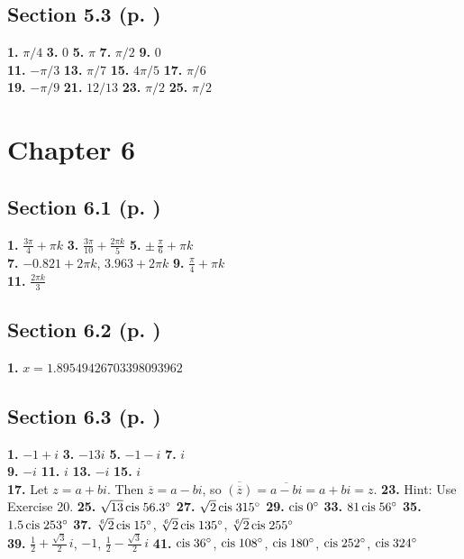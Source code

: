 \begin{multicols}{2}
\subsection*{Section 5.3 (p. \pageref{sec5dot3})}
\textbf{1.} $\pi/4$ \quad \textbf{3.} $0$ \quad \textbf{5.} $\pi$ \quad \textbf{7.} $\pi/2$ \quad
\textbf{9.} $0$\\\textbf{11.} $-\pi/3$ \quad \textbf{13.} $\pi/7$ \quad \textbf{15.} $4\pi/5$
\quad \textbf{17.} $\pi/6$\\\textbf{19.} $-\pi/9$ \quad \textbf{21.} $12/13$ \quad
\textbf{23.} $\pi/2$ \quad \textbf{25.} $\pi/2$
\section*{Chapter 6}
\subsection*{Section 6.1 (p. \pageref{sec6dot1})}
\textbf{1.} $\frac{3\pi}{4} + \pi k$ \quad \textbf{3.} $\frac{3\pi}{10} + \frac{2\pi k}{5}$ \quad
\textbf{5.} $\pm\,\frac{\pi}{6} + \pi k$\\\textbf{7.} $-0.821 + 2\pi k$, $3.963 + 2\pi k$ \quad
\textbf{9.} $\frac{\pi}{4} + \pi k$\\\textbf{11.} $\frac{2\pi k}{3}$
\subsection*{Section 6.2 (p. \pageref{sec6dot2})}
\textbf{1.} $x=1.89549426703398093962$
\subsection*{Section 6.3 (p. \pageref{sec6dot3})}
\textbf{1.} $-1+i$ \quad \textbf{3.} $-13i$ \quad \textbf{5.} $-1-i$ \quad \textbf{7.} $i$\\
\textbf{9.} $-i$ \quad \textbf{11.} $i$ \quad \textbf{13.} $-i$ \quad \textbf{15.} $i$\\
\textbf{17.} Let $z=a+bi$. Then $\overline{z}=a-bi$, so $\overline{\left(\overline{z}\right)} =
\overline{a-bi}=a+bi=z$. \quad \textbf{23.} Hint: Use Exercise 20. \quad
\textbf{25.} $\sqrt{13}\,\text{cis}\;56.3^\circ$ \quad
\textbf{27.} $\sqrt{2}\,\text{cis}\;315^\circ$ \quad \textbf{29.} $\text{cis}\;0^\circ$ \quad
\textbf{33.} $81\,\text{cis}\;56^\circ$ \quad \textbf{35.} $1.5\,\text{cis}\;253^\circ$ \quad
\textbf{37.} $\sqrt[6]{2}\,\text{cis}\;15^\circ$, $\sqrt[6]{2}\,\text{cis}\;135^\circ$,
$\sqrt[6]{2}\,\text{cis}\;255^\circ$\\\textbf{39.} $\frac{1}{2} + \frac{\sqrt{3}}{2}\,i$,
$-1$, $\frac{1}{2} - \frac{\sqrt{3}}{2}\,i$ \quad \textbf{41.} $\text{cis}\;36^\circ$,
$\text{cis}\;108^\circ$, $\text{cis}\;180^\circ$, $\text{cis}\;252^\circ$,
$\text{cis}\;324^\circ$

\end{multicols}

